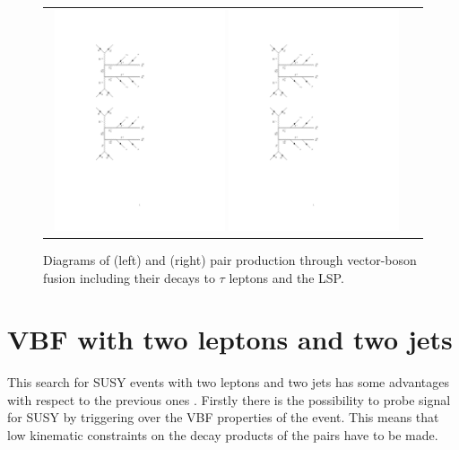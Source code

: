 \begin{figure}[tbh!]
	\centering
	\begin{tabular}{cc}
		\includegraphics[width=0.48\textwidth]{diagrams/pics/signal_C1N2.pdf}
		\includegraphics[width=0.48\textwidth]{diagrams/pics/signal_C1C1.pdf} 		
	\end{tabular}
	\caption{Diagrams of (left) \charginopm \neutralinotwo and (right) \charginopm \charginomp pair production through vector-boson fusion including their decays to $\tau$ leptons and the LSP.}
	\label{fig:VBF_diagrams}
\end{figure}

\section{VBF with two leptons and two jets}

This search for SUSY events with two leptons and two jets has some advantages with respect to the previous ones \cite{Dutta:2012xe}. Firstly there is the possibility to probe signal for SUSY by triggering over the VBF properties of the event. This means that low kinematic constraints on the decay products of the \charginopm \charginopm pairs have to be made.

